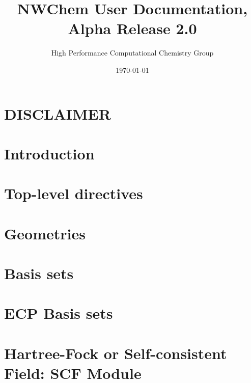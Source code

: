 \setlength{\parskip}{6pt}

\newcommand{\nwchemversion}{2.0}
\newcommand{\nwchemyear}{1996}



\title{\bf\Large NWChem User Documentation, Alpha Release \nwchemversion}
\author{High Performance Computational Chemistry Group}
\date{\today}
\maketitle

\section*{\center DISCLAIMER}


\clearpage

\tableofcontents

\clearpage

\section{Introduction}


\section{Top-level directives}


\section{Geometries}


\section{Basis sets}


\section{ECP Basis sets}


\section{Hartree-Fock or Self-consistent Field: SCF Module} 




